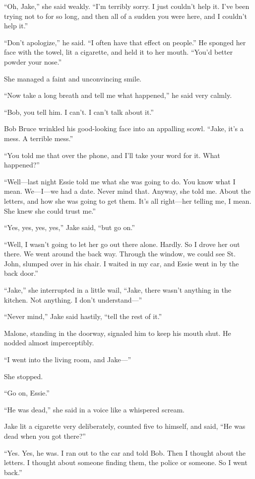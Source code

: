 \documentclass{novel}
\begin{document}
“Oh, Jake,” she said weakly. “I’m terribly sorry. I just couldn’t help it. I’ve been trying not to for so long, and then all of a sudden you were here, and I couldn’t help it.”

“Don’t apologize,” he said. “I often have that effect on people.” He sponged her face with the towel, lit a cigarette, and held it to her mouth. “You’d better powder your nose.”

She managed a faint and unconvincing smile.

“Now take a long breath and tell me what happened,” he said very calmly.

“Bob, you tell him. I can’t. I can’t talk about it.”

Bob Bruce wrinkled his good-looking face into an appalling scowl. “Jake, it’s a mess. A terrible mess.”

“You told me that over the phone, and I’ll take your word for it. What happened?”

“Well—last night Essie told me what she was going to do. You know what I mean. We—I—we had a date. Never mind that. Anyway, she told me. About the letters, and how she was going to get them. It’s all right—her telling me, I mean. She knew she could trust me.”

“Yes, yes, yes, yes,” Jake said, “but go on.”

“Well, I wasn’t going to let her go out there alone. Hardly. So I drove her out there. We went around the back way. Through the window, we could see St. John, slumped over in his chair. I waited in my car, and Essie went in by the back door.”

“Jake,” she interrupted in a little wail, “Jake, there wasn’t anything in the kitchen. Not anything. I don’t understand—”

“Never mind,” Jake said hastily, “tell the rest of it.”

Malone, standing in the doorway, signaled him to keep his mouth shut. He nodded almost imperceptibly.

“I went into the living room, and Jake—”

She stopped.

“Go on, Essie.”

“He was dead,” she said in a voice like a whispered scream.

Jake lit a cigarette very deliberately, counted five to himself, and said, “He was dead when you got there?”

“Yes. Yes, he was. I ran out to the car and told Bob. Then I thought about the letters. I thought about someone finding them, the police or someone. So I went back.”
\end{document}
